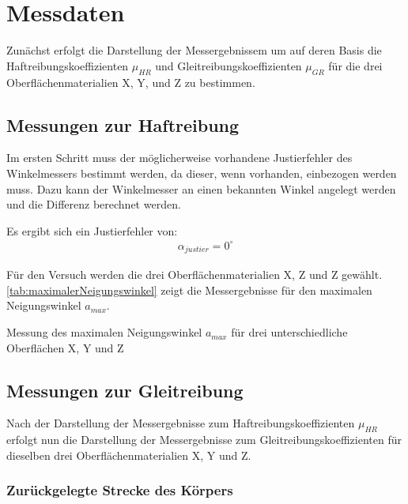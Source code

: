 \section{Messdaten}

Zunächst erfolgt die Darstellung der Messergebnissem um auf deren Basis die Haftreibungskoeffizienten $\mu_{HR}$ und Gleitreibungskoeffizienten $\mu_{GR}$ für die drei Oberflächenmaterialien X, Y, und Z zu bestimmen.

\subsection{Messungen zur Haftreibung} \label{chap:MessungHaftreibung}

Im ersten Schritt muss der möglicherweise vorhandene Justierfehler des Winkelmessers bestimmt werden, da dieser, wenn vorhanden, einbezogen werden muss. Dazu kann der Winkelmesser an einen bekannten Winkel angelegt werden und die Differenz berechnet werden. 

Es ergibt sich ein Justierfehler von:
\begin{align*}
    \alpha_{justier} = 0^\circ
\end{align*}

Für den Versuch werden die drei Oberflächenmaterialien X, Z und Z gewählt. \autoref{tab:maximalerNeigungswinkel} zeigt die Messergebnisse für den maximalen Neigungswinkel $a_{max}$.

\begin{table}[h]
    \center
    \caption[Messung des maximalen Neigungswinkel]{Messung des maximalen Neigungswinkel $a_{max}$ für drei unterschiedliche Oberflächen X, Y und Z}
    
    \label{tab:maximalerNeigungswinkel}
\end{table}

\subsection{Messungen zur Gleitreibung}

Nach der Darstellung der Messergebnisse zum Haftreibungskoeffizienten $\mu_{HR}$ erfolgt nun die Darstellung der Messergebnisse zum Gleitreibungskoeffizienten für dieselben drei Oberflächenmaterialien X, Y und Z.

\subsubsection{Zurückgelegte Strecke des Körpers}

